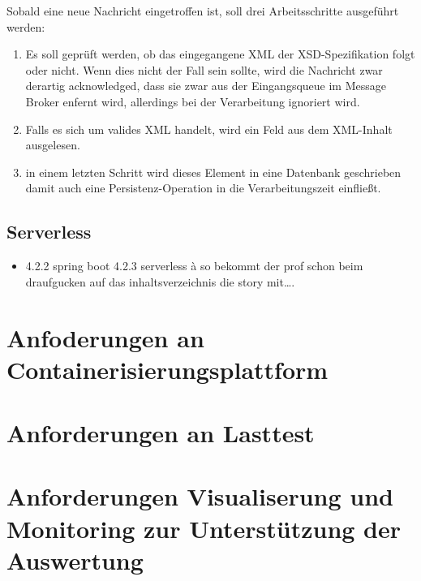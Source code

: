 Sobald eine neue Nachricht eingetroffen ist, soll drei Arbeitsschritte ausgeführt werden:

\begin{enumerate}

  \item Es soll geprüft werden, ob das eingegangene XML der XSD-Spezifikation folgt oder nicht. Wenn dies nicht der Fall sein sollte, wird die Nachricht zwar derartig acknowledged, dass sie zwar aus der Eingangsqueue im Message Broker enfernt wird, allerdings bei der Verarbeitung ignoriert wird.

  \item Falls es sich um valides XML handelt, wird ein Feld aus dem XML-Inhalt ausgelesen.

  \item in einem letzten Schritt wird dieses Element in eine Datenbank geschrieben damit auch eine Persistenz-Operation in die Verarbeitungszeit einfließt.

\end{enumerate}

\subsection{Serverless}
\begin{itemize}
  \item  4.2.2 spring boot 4.2.3 serverless à so bekommt der prof schon beim draufgucken auf das inhaltsverzeichnis die story mit….
\end{itemize}

\section{Anfoderungen an Containerisierungsplattform}
\section{Anforderungen an Lasttest}
\section{Anforderungen Visualiserung und Monitoring zur Unterstützung der Auswertung}

